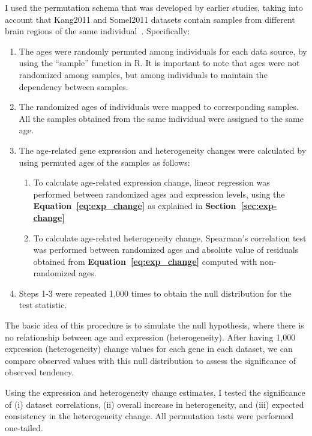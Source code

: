 I used the permutation schema that was developed by earlier studies, 
taking into account that Kang2011 and Somel2011 datasets contain samples from different brain regions of the same individual~\cite{Donertas2017, Donertas2018}.
Specifically: 

\begin{enumerate}
    \item The ages were randomly permuted among individuals for each data source, by using the ``sample'' function in R. 
    It is important to note that ages were not randomized among samples, but among individuals to maintain the dependency between samples.
    \item The randomized ages of individuals were mapped to corresponding samples. All the samples obtained from the same individual were assigned to the same age.
    \item The age-related gene expression and heterogeneity changes were calculated by using permuted ages of the samples as follows:
    \begin{enumerate}
        \item To calculate age-related expression change, linear regression was performed between randomized ages and expression levels, using the \textbf{Equation~\ref{eq:exp_change}} as explained in \textbf{Section~\ref{sec:exp-change}}
        \item To calculate age-related heterogeneity change, Spearman's correlation test was performed between randomized ages and absolute value of residuals obtained from \textbf{Equation~\ref{eq:exp_change}} computed with non-randomized ages.
    \end{enumerate} 
    \item Steps 1-3 were repeated 1,000 times to obtain the null distribution for the test statistic.
\end{enumerate}

The basic idea of this procedure is to simulate the null hypothesis, where there is no relationship between age and expression (heterogeneity).
After having 1,000 expression (heterogeneity) change values for each gene in each dataset, we can compare observed values with this null distribution
to assess the significance of observed tendency. 

Using the expression and heterogeneity change estimates, I tested the significance of 
(i) dataset correlations, (ii) overall increase in heterogeneity, and (iii) expected consistency in the heterogeneity change.
All permutation tests were performed one-tailed.

